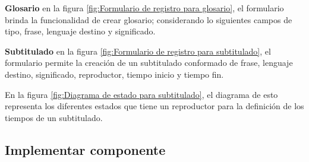 \textbf{Glosario} en la figura \ref{fig:Formulario de registro para glosario}, el
formulario brinda la funcionalidad de crear glosario; considerando lo
siguientes campos de tipo, frase, lenguaje destino y significado.

\begin{minipage}{1.0\textwidth}
	\centering
	\label{fig:Formulario de registro para glosario}
\end{minipage}

\textbf{Subtitulado} en la figura \ref{fig:Formulario de registro para subtitulado},
el formulario permite la creación de un subtitulado conformado de frase, lenguaje
destino, significado, reproductor, tiempo inicio y tiempo fin.

\begin{minipage}{1.0\textwidth}
	\centering
	\label{fig:Formulario de registro para subtitulado}
\end{minipage}

En la figura \ref{fig:Diagrama de estado para subtitulado}, el diagrama de
esto representa los diferentes estados que tiene un reproductor para la
definición de los tiempos de un subtitulado. 

\begin{minipage}{1.0\textwidth}
	\centering
	\label{fig:Diagrama de estado para subtitulado}
\end{minipage}

\subsection{Implementar componente}

